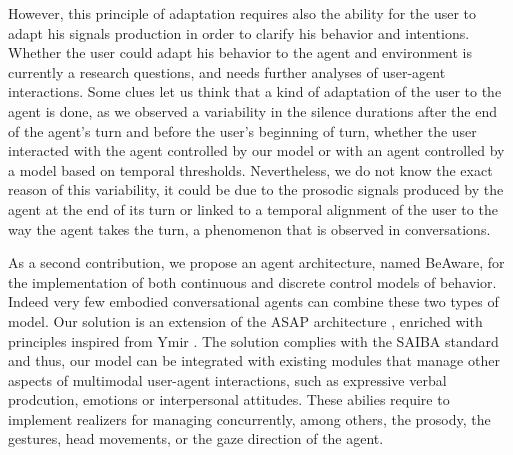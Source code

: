 However, this principle of adaptation requires also the ability for the user to adapt his signals production in order to clarify his behavior and intentions. Whether the user could adapt his behavior to the agent and environment is currently a research questions, and needs further analyses of user-agent interactions. 
Some clues let us think that a kind of adaptation of the user to the agent is done, as we observed a variability in the silence durations after the end of the agent's turn and before the user's beginning of turn, whether the user interacted with the agent controlled by our model or with an agent controlled by a model based on temporal thresholds. Nevertheless, we do not know the exact reason of this variability, it could be due to the prosodic signals produced by the agent at the end of its turn or linked to a temporal alignment of the user to the way the agent takes the turn, a phenomenon that is observed in conversations. 

As a second contribution, we propose an agent architecture, named BeAware, for the implementation of both continuous and discrete control models of behavior. 
Indeed very few embodied conversational agents can combine these two types of model. 
Our solution is an extension of the ASAP architecture \cite{kopp_architecture_2014}, enriched with principles inspired from Ymir \citep{thorisson_mind_1999}. 
The solution complies with the SAIBA standard and thus, our model can be integrated with existing modules that manage other aspects of multimodal user-agent interactions, such as expressive verbal prodcution, emotions or interpersonal attitudes. These abilies require to implement realizers for managing concurrently, among others, the prosody, the gestures, head movements, or the gaze direction of the agent.


